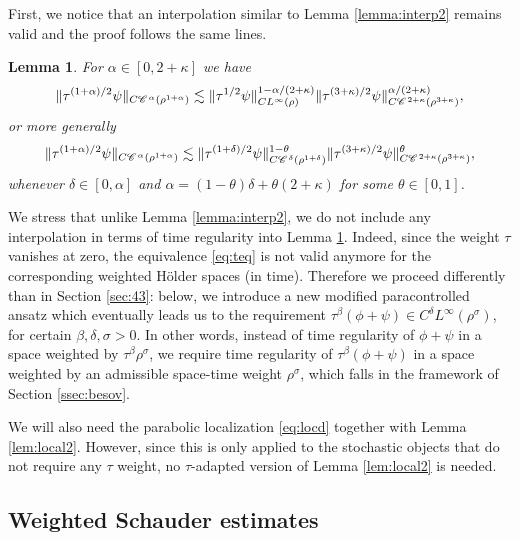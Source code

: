 \documentclass[a4paper,11pt]{article}
\newtheorem{lemma}[theorem]{Lemma}
\numberwithin{equation}{section}
\newcommand{\CC}{\mathscr{C} \hspace{.1em}}
\newcommand{\8}{\infty}
\begin{document}
First, we notice that an interpolation similar to Lemma \ref{lemma:interp2} remains valid and the proof follows the same lines.

\begin{lemma}
  \label{lemma:tau-space-interpolation}For $\alpha \in [0, 2 + \kappa]$ we
  have
  \[ \| \tau^{ (1 + \alpha) / 2} \psi \|_{C \CC^{\alpha} (\rho^{1 + \alpha})}
     \lesssim \| \tau^{1 / 2} \psi \|_{C L^{\infty} (\rho)}^{1 - \alpha / (2 + 
     \kappa)} \| \tau^{(3 + \kappa) / 2} \psi \|_{C \CC^{2 + \kappa} (\rho^{3
     + \kappa})}^{\alpha / (2 + \kappa)}, \]
  or more generally
  \[ \| \tau^{ (1 + \alpha) / 2} \psi \|_{C \CC^{\alpha} (\rho^{1 + \alpha})}
     \lesssim \| \tau^{(1 + \delta) / 2} \psi \|_{C \CC^{\delta} (\rho^{1 +
     \delta})}^{1 - \theta} \| \tau^{(3 + \kappa) / 2} \psi \|_{C \CC^{2 +
     \kappa} (\rho^{3 + \kappa})}^{\theta}, \]
  whenever $\delta \in [0, \alpha]$ and $\alpha = (1 - \theta) \delta + \theta
  (2 + \kappa)$ for some $\theta \in [0, 1]$.
\end{lemma}

We stress that unlike Lemma \ref{lemma:interp2}, we do not include any interpolation in terms of time regularity into Lemma \ref{lemma:tau-space-interpolation}. Indeed, since the weight $\tau$ vanishes at zero, the equivalence  \eqref{eq:teq} is not valid anymore for the  corresponding weighted H\"older  spaces (in time). Therefore we proceed differently than in  Section \ref{sec:43}: below, we introduce a new modified paracontrolled ansatz which eventually leads us to the requirement $\tau^{\beta}(\phi+\psi)\in C^{{\delta}}L^{\infty}(\rho^{\sigma})$, for certain $\beta,\delta,\sigma>0$. In other words, instead of time regularity of $\phi+\psi$ in a space weighted by $\tau^{\beta}\rho^{\sigma}$, we require time regularity of $\tau^{\beta}(\phi+\psi)$ in a space weighted by an admissible space-time weight $\rho^{\sigma}$, which falls in the framework of Section \ref{ssec:besov}.


We will also need the parabolic localization \eqref{eq:locd} together with Lemma \ref{lem:local2}. However, since this is only applied to the stochastic objects that do not require any $\tau$ weight, no $\tau$-adapted version of Lemma \ref{lem:local2} is needed.




\subsection{Weighted Schauder estimates}
\label{ss:d1}
\end{document}
